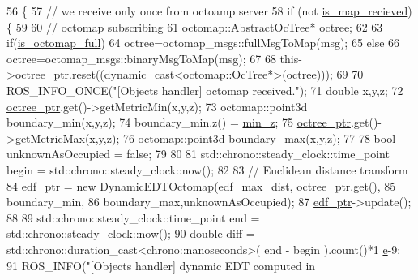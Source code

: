 \begin{DoxyCode}
56                                                                    \{
57     \textcolor{comment}{// we receive only once from octoamp server}
58     \textcolor{keywordflow}{if} (not \hyperlink{class_objects_handler_acf1ef1b318defc2a39d87cea72689478}{is\_map\_recieved})\{
59 
60         \textcolor{comment}{// octomap subscribing }
61         octomap::AbstractOcTree* octree;
62 
63         \textcolor{keywordflow}{if}(\hyperlink{class_objects_handler_a56f70ac04c01e8b948a4b44fa5670f49}{is\_octomap\_full})
64             octree=octomap\_msgs::fullMsgToMap(msg);
65         \textcolor{keywordflow}{else}
66             octree=octomap\_msgs::binaryMsgToMap(msg);
67 
68         this->\hyperlink{class_objects_handler_a76ad7ca7513755408c02dd36dea94c6e}{octree\_ptr}.reset((dynamic\_cast<octomap::OcTree*>(octree)));
69 
70         ROS\_INFO\_ONCE(\textcolor{stringliteral}{"[Objects handler] octomap received."});
71         \textcolor{keywordtype}{double} x,y,z;
72         \hyperlink{class_objects_handler_a76ad7ca7513755408c02dd36dea94c6e}{octree\_ptr}.get()->getMetricMin(x,y,z);
73         octomap::point3d boundary\_min(x,y,z); 
74         boundary\_min.z() = \hyperlink{class_objects_handler_ac8c10c7a10aeb8abf1a44b7361f646e6}{min\_z};
75         \hyperlink{class_objects_handler_a76ad7ca7513755408c02dd36dea94c6e}{octree\_ptr}.get()->getMetricMax(x,y,z);
76         octomap::point3d boundary\_max(x,y,z); 
77 
78         \textcolor{keywordtype}{bool} unknownAsOccupied = \textcolor{keyword}{false};
79 
80 
81         std::chrono::steady\_clock::time\_point begin = std::chrono::steady\_clock::now();
82 
83         \textcolor{comment}{// Euclidean distance transform  }
84         \hyperlink{class_objects_handler_aa96d8c71f5e8c6423c88d3302220d4cf}{edf\_ptr} = \textcolor{keyword}{new} DynamicEDTOctomap(\hyperlink{class_objects_handler_ae71885df3c4e28f45be7bb0e5a383293}{edf\_max\_dist},
      \hyperlink{class_objects_handler_a76ad7ca7513755408c02dd36dea94c6e}{octree\_ptr}.get(),
85         boundary\_min,
86         boundary\_max,unknownAsOccupied);
87         \hyperlink{class_objects_handler_aa96d8c71f5e8c6423c88d3302220d4cf}{edf\_ptr}->update();    
88 
89         std::chrono::steady\_clock::time\_point end = std::chrono::steady\_clock::now();
90         \textcolor{keywordtype}{double} diff = std::chrono::duration\_cast<chrono::nanoseconds>( end - begin ).count()*1
      \hyperlink{namespace__setup__util_acdce690b925de33d6249bbbfa1109d61}{e}-9;
91         ROS\_INFO(\textcolor{stringliteral}{"[Objects handler] dynamic EDT computed in %
}
\end{DoxyCode}
